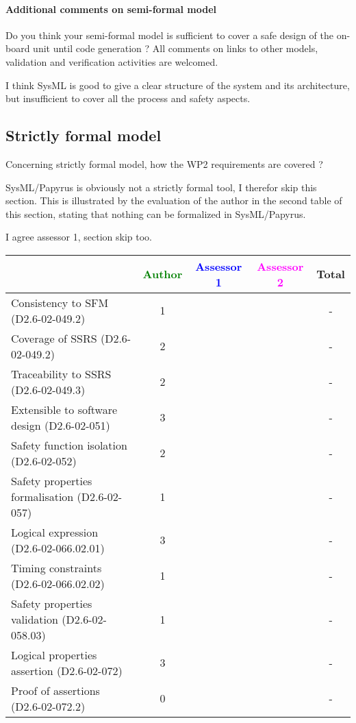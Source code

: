 \paragraph{Additional comments on semi-formal model} Do you think your semi-formal model is sufficient to cover a safe design of the on-board unit until code generation ?
All comments on links to other models, validation and verification activities are welcomed.


\begin{assessor2}
I think SysML is good to give a clear structure of the system and its architecture, but insufficient to cover all the process and safety aspects.
\end{assessor2}

\subsection{Strictly formal model}

Concerning strictly formal model, how the WP2 requirements are covered ?

\begin{assessor1}
SysML/Papyrus is obviously not a strictly formal tool, I therefor skip this section. 
This is illustrated by the evaluation of the author in the second table of this section, stating that nothing can be formalized in SysML/Papyrus. 
\end{assessor1}


\begin{assessor2}
I agree assessor 1, section skip too.
\end{assessor2}

\begin{tabular}{|l | c | c | c | c|}
\hline
& \textcolor{green}{Author} & \textcolor{blue}{Assessor 1} & \textcolor{magenta}{Assessor 2} & Total \\
\hline
Consistency to SFM (D2.6-02-049.2) & 1 & & & - \\
\hline
Coverage of SSRS (D2.6-02-049.2) & 2 & & & - \\
\hline
Traceability to SSRS (D2.6-02-049.3) & 2 && & - \\
\hline
Extensible to software design (D2.6-02-051) & 3 & & & - \\
\hline
Safety function isolation (D2.6-02-052) & 2 & & & - \\
\hline
Safety properties formalisation (D2.6-02-057) & 1 & & & - \\
\hline
Logical expression (D2.6-02-066.02.01) & 3 & & & - \\
\hline
Timing constraints (D2.6-02-066.02.02) & 1 & & & - \\
\hline
Safety properties validation (D2.6-02-058.03) & 1 & & & - \\
\hline
Logical properties assertion (D2.6-02-072) & 3 & & & - \\
\hline
Proof of assertions (D2.6-02-072.2) & 0 & & & - \\
\hline
\end{tabular}

